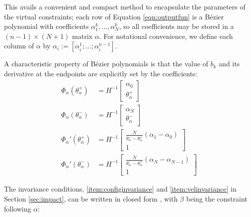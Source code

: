 This avails a convenient and compact method to encapsulate the parameters of the virtual constraints; each row of Equation \ref{eqn:outputfun} is a Bézier polynomial with coefficients $\alpha_1^k, \ldots, \alpha_N^k$, so all coefficients may be stored in a $(n-1)\times(N+1)$ matrix $\alpha$. For notational convenience, we define each column of $\alpha$ by $\alpha_i := [\alpha_i^1; \ldots; \alpha_i^{n-1}]$.

A characteristic property of Bézier polynomials is that the value of $b_k$ and its derivative at the endpoints are explicitly set by the coefficients:
\begin{subequations}
\begin{align}
	\Phi_\alpha\left(\theta_\alpha^+\right) &= H^{-1}\begin{bmatrix}
		\alpha_0 \\ \theta_\alpha^+
	\end{bmatrix} \\
	\Phi_\alpha\left(\theta_\alpha^-\right) &= H^{-1}\begin{bmatrix}
		\alpha_N \\ \theta_\alpha^-
	\end{bmatrix} \\
	\Phi_\alpha'\left(\theta_\alpha^+\right) &= H^{-1}\begin{bmatrix}
		\frac{N}{\theta_\alpha^- - \theta_\alpha^+}(\alpha_1 - \alpha_0) \\
		1
	\end{bmatrix} \\
	\Phi_\alpha'\left(\theta_\alpha^-\right) &= H^{-1}\begin{bmatrix}
		\frac{N}{\theta_\alpha^- - \theta_\alpha^+}(\alpha_N - \alpha_{N-1}) \\
		1
	\end{bmatrix}
\end{align}
\end{subequations}

The invariance conditions, \ref{item:configinvariance} and \ref{item:velinvariance} in Section \ref{sec:impact}, can be written in closed form \cite{westervelt2007feedback}, with $\beta$ being the constraint following $\alpha$:

